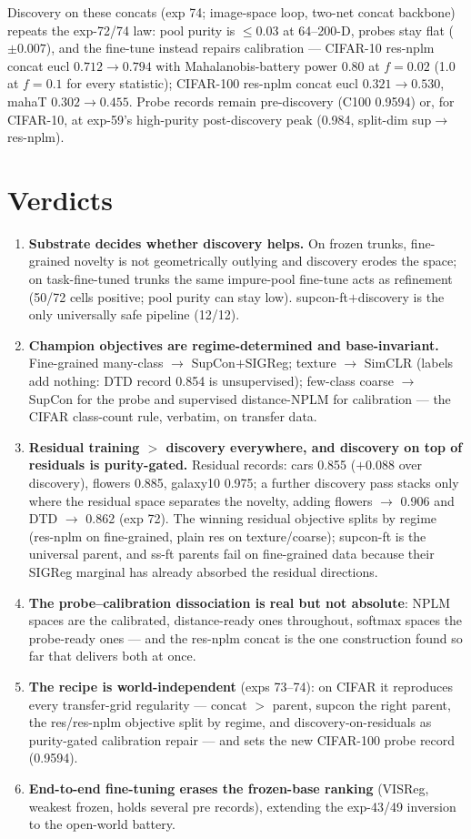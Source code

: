 \documentclass[11pt]{article}
\begin{document}
Discovery on these concats (exp 74; image-space loop, two-net concat
backbone) repeats the exp-72/74 law: pool purity is $\le 0.03$ at
64--200-D, probes stay flat ($\pm 0.007$), and the fine-tune instead
repairs calibration --- CIFAR-10 res-nplm concat eucl
$0.712\!\to\!0.794$ with Mahalanobis-battery power 0.80 at $f{=}0.02$
(1.0 at $f{=}0.1$ for every statistic); CIFAR-100 res-nplm concat eucl
$0.321\!\to\!0.530$, mahaT $0.302\!\to\!0.455$.  Probe records remain
pre-discovery (C100 0.9594) or, for CIFAR-10, at exp-59's high-purity
post-discovery peak (0.984, split-dim sup$\to$res-nplm).

\section{Verdicts}

\begin{enumerate}\itemsep3pt
\item \textbf{Substrate decides whether discovery helps.}  On frozen
trunks, fine-grained novelty is not geometrically outlying and discovery
erodes the space; on task-fine-tuned trunks the same impure-pool
fine-tune acts as refinement (50/72 cells positive; pool purity can stay
low).  supcon-ft$+$discovery is the only universally safe pipeline
(12/12).
\item \textbf{Champion objectives are regime-determined and
base-invariant.}  Fine-grained many-class $\to$ SupCon$+$SIGReg;
texture $\to$ SimCLR (labels add nothing: DTD record 0.854 is
unsupervised); few-class coarse $\to$ SupCon for the probe and
supervised distance-NPLM for calibration --- the CIFAR class-count rule,
verbatim, on transfer data.
\item \textbf{Residual training $>$ discovery everywhere, and discovery
on top of residuals is purity-gated.}  Residual records: cars 0.855
($+0.088$ over discovery), flowers 0.885, galaxy10 0.975; a further
discovery pass stacks only where the residual space separates the
novelty, adding flowers $\to$ 0.906 and DTD $\to$ 0.862 (exp 72).  The
winning residual objective splits by regime (res-nplm on fine-grained,
plain res on texture/coarse); supcon-ft is the universal parent, and
ss-ft parents fail on fine-grained data because their SIGReg marginal
has already absorbed the residual directions.
\item \textbf{The probe--calibration dissociation is real but not
absolute}: NPLM spaces are the calibrated, distance-ready ones
throughout, softmax spaces the probe-ready ones --- and the
res-nplm concat is the one construction found so far that delivers
both at once.
\item \textbf{The recipe is world-independent} (exps 73--74): on CIFAR
it reproduces every transfer-grid regularity --- concat $>$ parent,
supcon the right parent, the res/res-nplm objective split by regime,
and discovery-on-residuals as purity-gated calibration repair --- and
sets the new CIFAR-100 probe record (0.9594).
\item \textbf{End-to-end fine-tuning erases the frozen-base ranking}
(VISReg, weakest frozen, holds several pre records), extending the
exp-43/49 inversion to the open-world battery.
\end{enumerate}
\end{document}
